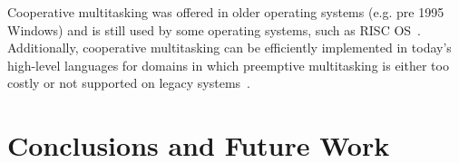 \documentclass[sigconf]{acmart}
\newcommand{\TSAdded}[1]{#1}
\begin{document}
{%
%


%
Cooperative multitasking was offered in older operating systems
(e.g. pre 1995 Windows) and is still used by some operating systems,
such as RISC OS~\cite{risc-os-multitasking}. \TSAdded{Additionally,
  cooperative multitasking can be efficiently implemented in today's
  high-level languages for domains in which preemptive multitasking is
  either too costly or not supported on legacy
  systems~\cite{Tarpenning:1991:CMC:136810.136820}}.


%


\section{Conclusions and Future Work}\label{sec:conclusion}

}
\end{document}
